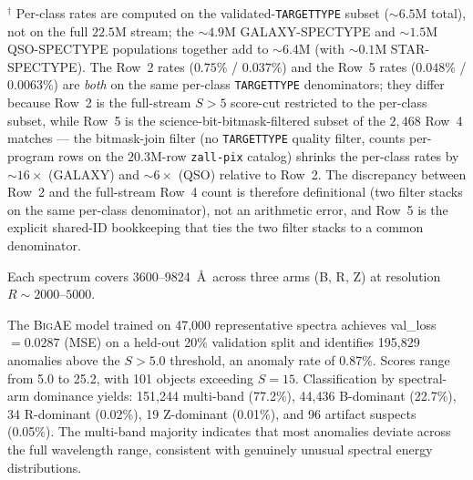 \documentclass[aps,prd,twocolumn,superscriptaddress,showpacs,preprintnumbers,nofootinbib,longbibliography,floatfix]{revtex4-2}
\newcommand{\BigAE}{\textsc{BigAE}}
\begin{document}
\begin{table}[!htb]
{\footnotesize $^\dagger$ Per-class rates are computed on the validated-\texttt{TARGETTYPE} subset (${\sim}6.5$M total), not on the full $22.5$M stream; the ${\sim}4.9$M GALAXY-SPECTYPE and ${\sim}1.5$M QSO-SPECTYPE populations together add to ${\sim}6.4$M (with ${\sim}0.1$M STAR-SPECTYPE). The Row~2 rates ($0.75\%$ / $0.037\%$) and the Row~5 rates ($0.048\%$ / $0.0063\%$) are \emph{both} on the same per-class \texttt{TARGETTYPE} denominators; they differ because Row~2 is the full-stream $S>5$ score-cut restricted to the per-class subset, while Row~5 is the science-bit-bitmask-filtered subset of the $2{,}468$ Row~4 matches --- the bitmask-join filter (no \texttt{TARGETTYPE} quality filter, counts per-program rows on the $20.3$M-row \texttt{zall-pix} catalog) shrinks the per-class rates by ${\sim}16\times$ (GALAXY) and ${\sim}6\times$ (QSO) relative to Row~2. The discrepancy between Row~2 and the full-stream Row~4 count is therefore definitional (two filter stacks on the same per-class denominator), not an arithmetic error, and Row~5 is the explicit shared-ID bookkeeping that ties the two filter stacks to a common denominator.}
\end{table} Each spectrum covers 3600--9824~\AA\ across three arms (B, R, Z) at resolution $R \sim 2000$--$5000$.

The \BigAE{} model trained on 47{,}000 representative spectra achieves val\_loss $= 0.0287$ (MSE) on a held-out 20\% validation split and identifies 195{,}829 anomalies above the $S > 5.0$ threshold, an anomaly rate of 0.87\%. Scores range from 5.0 to 25.2, with 101 objects exceeding $S = 15$. Classification by spectral-arm dominance yields: 151{,}244 multi-band (77.2\%), 44{,}436 B-dominant (22.7\%), 34 R-dominant (0.02\%), 19 Z-dominant (0.01\%), and 96 artifact suspects (0.05\%). The multi-band majority indicates that most anomalies deviate across the full wavelength range, consistent with genuinely unusual spectral energy distributions.
\end{document}
